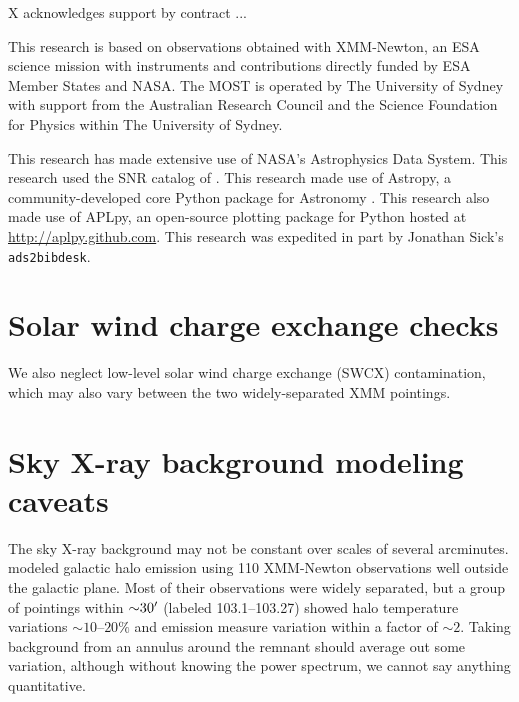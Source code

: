 \documentclass[preprint2,tighten,trackchanges]{aastex6}
\newcommand*{\abt}{\mathord{\sim}} %
\begin{document}
\acknowledgments

X acknowledges support by contract ...

This research is based on observations obtained with XMM-Newton, an ESA science
mission with instruments and contributions directly funded by ESA Member States
and NASA.
The MOST is operated by The University of Sydney with support from the
Australian Research Council and the Science Foundation for Physics within The
University of Sydney.

This research has made extensive use of NASA's Astrophysics Data System.
This research used the SNR catalog of \citet{ferrand2012}.
This research made use of Astropy, a community-developed core Python package
for Astronomy \citep{astropy2013}.
This research also made use of APLpy, an open-source plotting package for
Python hosted at \url{http://aplpy.github.com}.
This research was expedited in part by Jonathan Sick's \texttt{ads2bibdesk}.






\clearpage  %
\appendix

\setcounter{table}{0}
\renewcommand{\thetable}{A\arabic{table}}
\setcounter{figure}{0}
\renewcommand{\thefigure}{A\arabic{figure}}

\section{Solar wind charge exchange checks}

We also neglect low-level solar wind charge exchange (SWCX) contamination,
which may also vary between the two widely-separated XMM pointings.


\section{Sky X-ray background modeling caveats}

The sky X-ray background may not be constant over scales of several arcminutes.
\citet{henley2013} modeled galactic halo emission using 110 XMM-Newton
observations well outside the galactic plane.
Most of their observations were widely separated, but a group of pointings
within $\abt 30\arcmin$ (labeled 103.1--103.27) showed halo temperature
variations $\abt 10$--$20\%$ and emission measure variation within a factor of
$\abt 2$.
Taking background from an annulus around the remnant should average out some
variation, although without knowing the power spectrum, we cannot say anything
quantitative.
\end{document}
